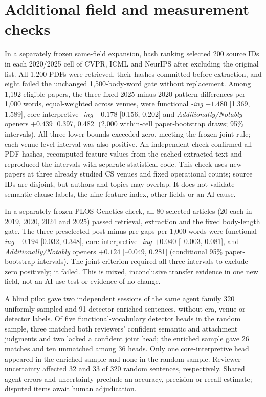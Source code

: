\documentclass[10pt,twocolumn]{article}
\begin{document}
\clearpage
\section{Additional field and measurement checks}
In a separately frozen same-field expansion, hash ranking selected 200 source IDs in each 2020/2025 cell of CVPR, ICML and NeurIPS after excluding the original list. All 1,200 PDFs were retrieved, their hashes committed before extraction, and eight failed the unchanged 1,500-body-word gate without replacement. Among 1,192 eligible papers, the three fixed 2025-minus-2020 pattern differences per 1,000 words, equal-weighted across venues, were functional \textit{-ing} $+1.480$ [1.369, 1.589], core interpretive \textit{-ing} $+0.178$ [0.156, 0.202] and \textit{Additionally/Notably} openers $+0.439$ [0.397, 0.482] (2,000 within-cell paper-bootstrap draws; 95\% intervals). All three lower bounds exceeded zero, meeting the frozen joint rule; each venue-level interval was also positive. An independent check confirmed all PDF hashes, recomputed feature values from the cached extracted text and reproduced the intervals with separate statistical code. This check uses new papers at three already studied CS venues and fixed operational counts; source IDs are disjoint, but authors and topics may overlap. It does not validate semantic clause labels, the nine-feature index, other fields or an AI cause.

In a separately frozen PLOS Genetics check, all 80 selected articles (20 each in 2019, 2020, 2024 and 2025) passed retrieval, extraction and the fixed body-length gate. The three preselected post-minus-pre gaps per 1,000 words were functional \textit{-ing} $+0.194$ [0.032, 0.348], core interpretive \textit{-ing} $+0.040$ [--0.003, 0.081], and \textit{Additionally/Notably} openers $+0.124$ [--0.049, 0.281] (conditional 95\% paper-bootstrap intervals). The joint criterion required all three intervals to exclude zero positively; it failed. This is mixed, inconclusive transfer evidence in one new field, not an AI-use test or evidence of no change.

A blind pilot gave two independent sessions of the same agent family 320 uniformly sampled and 91 detector-enriched sentences, without era, venue or detector labels. Of five functional-vocabulary detector heads in the random sample, three matched both reviewers' confident semantic and attachment judgments and two lacked a confident joint head; the enriched sample gave 26 matches and ten unmatched among 36 heads. Only one core-interpretive head appeared in the enriched sample and none in the random sample. Reviewer uncertainty affected 32 and 33 of 320 random sentences, respectively. Shared agent errors and uncertainty preclude an accuracy, precision or recall estimate; disputed items await human adjudication.
\end{document}
